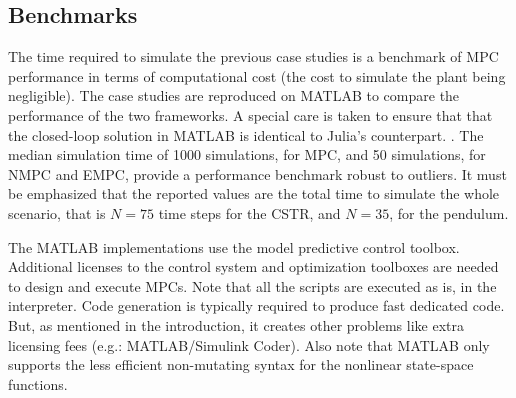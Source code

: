 \subsection{Benchmarks}
\label{sec:benchmarks}

The time required to simulate the previous case studies is a benchmark of MPC performance in terms of computational cost (the cost to simulate the plant being negligible). The case studies are reproduced on MATLAB to compare the performance of the two frameworks. A special care is taken to ensure that that the closed-loop solution in MATLAB is identical to Julia’s counterpart. . The median simulation time of 1000 simulations, for MPC, and 50 simulations, for NMPC and EMPC, provide a performance benchmark robust to outliers. It must be emphasized that the reported values are the total time to simulate the whole scenario, that is $N=75$ time steps for the CSTR, and $N=35$, for the pendulum.

The MATLAB implementations use the model predictive control toolbox. Additional licenses to the control system and optimization toolboxes are needed to design and execute MPCs. Note that all the scripts are executed as is, in the interpreter. Code generation is typically required to produce fast dedicated code. But, as mentioned in the introduction, it creates other problems like extra licensing fees (e.g.: MATLAB/Simulink Coder). Also note that MATLAB only supports the less efficient non-mutating syntax for the nonlinear state-space functions.

